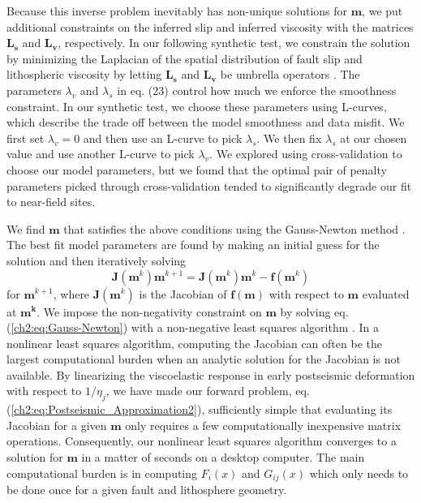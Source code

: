 Because this inverse problem inevitably has non-unique solutions for
$\mathbf{m}$, we put additional constraints on the inferred slip and
inferred viscosity with the matrices $\mathbf{L_s}$ and $\mathbf{L_v}$,
respectively.  In our following synthetic test, we constrain the
solution by minimizing the Laplacian of the spatial distribution of
fault slip and lithospheric viscosity by letting $\mathbf{L_s}$ and
$\mathbf{L_v}$ be umbrella operators \citep{Desbrun1999}.  The parameters
$\lambda_v$ and $\lambda_s$ in eq. (23) control how much we enforce
the smoothness constraint.  In our synthetic test, we choose these
parameters using L-curves, which describe the trade off between the
model smoothness and data misfit.  We first set $\lambda_v=0$ and then
use an L-curve to pick $\lambda_s$.  We then fix $\lambda_s$ at our
chosen value and use another L-curve to pick $\lambda_v$.  We explored
using cross-validation to choose our model parameters, but we found
that the optimal pair of penalty parameters picked through
cross-validation tended to significantly degrade our fit to near-field
sites.

We find $\mathbf{m}$ that satisfies the above conditions using the
Gauss-Newton method \citep[e.g.,][]{Aster2011}.  The best fit model
parameters are found by making an initial guess for the solution and
then iteratively solving
\begin{equation}\label{ch2:eq:Gauss-Newton}
\mathbf{J}(\mathbf{m}^{k})\mathbf{m}^{k+1} = 
\mathbf{J}(\mathbf{m}^{k})\mathbf{m}^{k} -
\mathbf{f}(\mathbf{m}^k)
\end{equation}
for $\mathbf{m}^{k+1}$, where $\mathbf{J}(\mathbf{m}^k)$ is the
Jacobian of $\mathbf{f(m)}$ with respect to $\mathbf{m}$ evaluated at
$\mathbf{m^k}$. We impose the non-negativity constraint on
$\mathbf{m}$ by solving eq. (\ref{ch2:eq:Gauss-Newton}) with a non-negative
least squares algorithm \citep{Lawson1995}. In a nonlinear least
squares algorithm, computing the Jacobian can often be the largest
computational burden when an analytic solution for the Jacobian is not
available. By linearizing the viscoelastic response in early
postseismic deformation with respect to $1/\eta_j$, we have made our
forward problem, eq. (\ref{ch2:eq:Postseismic_Approximation2}), sufficiently
simple that evaluating its Jacobian for a given $\mathbf{m}$ only
requires a few computationally inexpensive matrix operations.
Consequently, our nonlinear least squares algorithm converges to a
solution for $\mathbf{m}$ in a matter of seconds on a desktop
computer.  The main computational burden is in computing $F_i(x)$ and
$G_{ij}(x)$ which only needs to be done once for a given fault and
lithosphere geometry.

